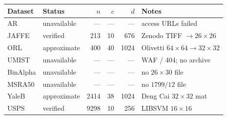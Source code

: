 \begin{tabular}{llrrrl}
\toprule
Dataset & Status & $n$ & $c$ & $d$ & Notes \\
\midrule
AR & unavailable & --- & --- & --- & access URLs failed \\
JAFFE & verified & 213 & 10 & 676 & Zenodo TIFF $\to26\times26$ \\
ORL & approximate & 400 & 40 & 1024 & Olivetti $64\times64\to32\times32$ \\
UMIST & unavailable & --- & --- & --- & WAF / 404; no archive \\
BinAlpha & unavailable & --- & --- & --- & no $26\times30$ file \\
MSRA50 & unavailable & --- & --- & --- & no $1799/12$ file \\
YaleB & approximate & 2414 & 38 & 1024 & Deng Cai $32\times32$ mat \\
USPS & verified & 9298 & 10 & 256 & LIBSVM $16\times16$ \\
\bottomrule
\end{tabular}
